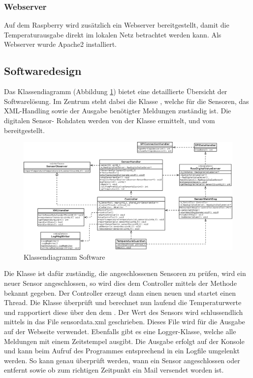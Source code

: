 \subsubsection{Webserver}
Auf dem Raspberry wird zusätzlich ein Webserver bereitgestellt, damit die Temperaturausgabe direkt im lokalen Netz betrachtet werden kann. Als Webserver wurde Apache2 installiert.

\subsection{Softwaredesign}

Das Klassendiagramm (Abbildung \ref{fig:classdia}) bietet eine detaillierte Übersicht der Softwarelösung. Im Zentrum steht dabei die Klasse , welche für die Sensoren, das XML-Handling sowie der Ausgabe benötigter Meldungen zuständig ist. Die digitalen Sensor- Rohdaten werden von der Klasse  ermittelt, und vom  bereitgestellt.

\begin{figure}[H]%
\centering
\includegraphics[width=1\textwidth]{Images/Klassendiagramm.png}
\caption{Klassendiagramm Software}
\label{fig:classdia}
\end{figure}

Die Klasse  ist dafür zuständig, die angeschlossenen Sensoren zu prüfen, wird ein neuer Sensor angeschlossen, so wird dies dem Controller mittels der Methode  bekannt gegeben. Der Controller erzeugt dann einen neuen  und startet einen Thread. Die Klasse  überprüft und berechnet nun laufend die Temperaturwerte und rapportiert diese über den  dem . Der Wert des Sensors wird schlussendlich mittels  in das File sensordata.xml geschrieben. Dieses File wird für die Ausgabe auf der Webseite verwendet.
Ebenfalls gibt es eine Logger-Klasse, welche alle Meldungen mit einem Zeitstempel ausgibt. Die Ausgabe erfolgt auf der Konsole und kann beim Aufruf des Programmes entsprechend in ein Logfile umgelenkt werden. So kann genau überprüft werden, wann ein Sensor angeschlossen oder entfernt sowie ob zum richtigen Zeitpunkt ein Mail versendet worden ist.

